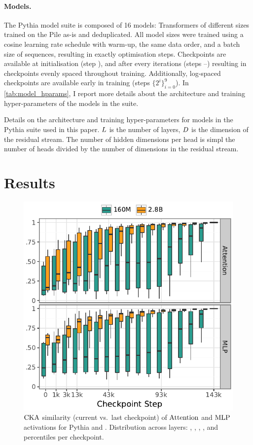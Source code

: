 \paragraph{Models.}
The Pythia model suite is composed of 16 models: Transformers of  different sizes trained on the Pile as-is and deduplicated.
All model sizes were trained using a cosine learning rate schedule with warm-up, the same data order, and a batch size of  sequences, resulting in exactly  optimisation steps.
Checkpoints are available at initialisation (step ), and after every  iterations (steps --) resulting in  checkpoints evenly spaced throughout training. 
Additionally, log-spaced checkpoints are available early in training (steps $\{2^i\}_{i=0}^{9}$). In \cref{tab:model_hparams}, I report more details about the architecture and training hyper-parameters of the models in the suite.

\begin{table}[!t]
    \centering
    
    \caption{Details on the architecture and training hyper-parameters for models in the Pythia suite used in this paper. $L$ is the number of layers, $D$ is the dimension of the residual stream. The number of hidden dimensions per head is simpl the number of heads divided by the number of dimensions in the residual stream.}
    \label{tab:model_hparams}
\end{table}


\clearpage
\section{Results}
\label{sec:tending-towards-stability-results}

\begin{figure}
    \vspace{-36pt}
    \centering
    \includegraphics[width=0.54\columnwidth]{chapters/tending-towards-stability/figures/cka_main_plot.pdf}
    \caption{$\mathrm{CKA}$ similarity (current vs.\ last checkpoint) of $\mathrm{Attention}$ and $\mathrm{MLP}$ activations for Pythia \sixmil and \twobil. Distribution across layers: , , , , and  percentiles per checkpoint.}
    \label{fig:cka_main_plot}
    \vspace{-1em}
\end{figure}

